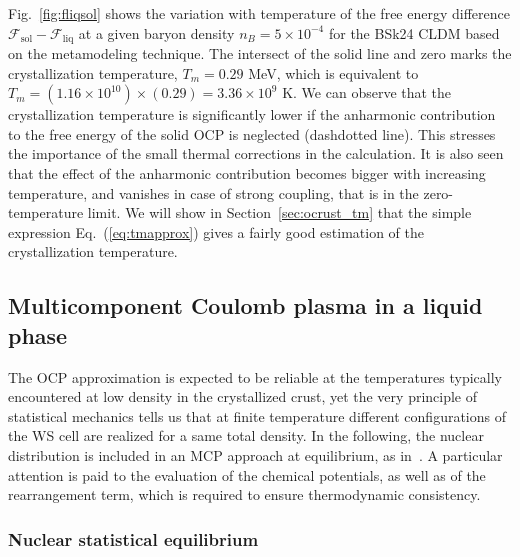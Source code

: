 Fig.~\ref{fig:fliqsol} shows the variation with temperature of the free energy
difference $\mathcal{F}_{\text{sol}}-\mathcal{F}_{\text{liq}}$ at a given
baryon density $n_B = 5\times 10^{-4}$ for the BSk24 CLDM based on the 
metamodeling technique. The intersect of the solid line and zero marks
the crystallization temperature, $T_m = 0.29$ MeV, which is equivalent to $T_m
= (1.16\times 10^{10}) \times (0.29) = 3.36 \times 10^9$ K. We can observe that
the crystallization temperature is significantly lower if the 
anharmonic contribution to the free energy of the solid OCP is neglected 
(dashdotted line). This stresses the importance of the small thermal
corrections in the calculation. It is also seen that the effect of the 
anharmonic contribution becomes bigger with increasing temperature, and 
vanishes in case of strong coupling, that is in the zero-temperature limit. We
will show in Section~\ref{sec:ocrust_tm} that the simple expression 
Eq.~(\ref{eq:tmapprox}) gives a fairly good estimation of the 
crystallization temperature.

\subsection{Multicomponent Coulomb plasma in a liquid phase}\label{subsec:mcp}

The OCP approximation is expected to be reliable at the temperatures
typically encountered at low density in the crystallized crust, yet the 
very principle of statistical mechanics tells us that at finite temperature 
different configurations of the WS cell are realized for a same total density.
In the following, the nuclear distribution is included in an MCP approach at 
equilibrium, as in~\cite{Fantina2020,Carreau2020}. A 
particular attention is paid to the evaluation of the chemical potentials, as 
well as of the rearrangement term, which is required to ensure thermodynamic 
consistency. 

\subsubsection{Nuclear statistical equilibrium}

